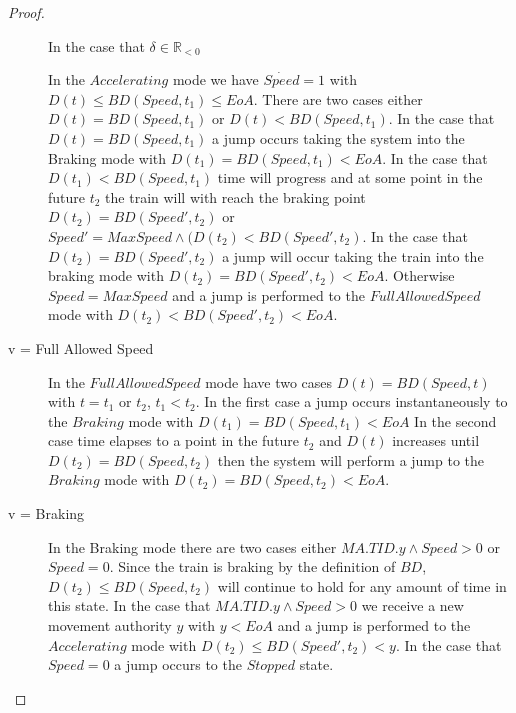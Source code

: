 \begin{mytheorem}
\begin{proof}
\begin{description}
In the case that $\delta \in \mathbb{R}_{< 0}$



 In the $Accelerating$ mode we have $\dot{Speed} = 1$ with $D(t) \leq BD(Speed, t_1) \leq  EoA$. There are two cases either $D(t) = BD(Speed,t_1)$ or $D(t) < BD(Speed, t_1)$.  In the case that $D(t) = BD(Speed,t_1)$  a jump occurs taking the system into the Braking mode
with $D(t_1) = BD(Speed,t_1) < EoA$. In the case that $D(t_1) < BD(Speed,t_1)$ time will progress and at some point in the future $t_2$ the train will with reach the braking point $D(t_2) = BD(Speed',t_2)$ or $Speed' = Max Speed \wedge (D(t_2) < BD(Speed', t_2)$.   In the case that $D(t_2) = BD(Speed', t_2)$ a jump will occur taking the train into the braking mode with $D(t_2) = BD(Speed',t_2) < EoA$. Otherwise $Speed = MaxSpeed$ and a jump is performed to the $Full Allowed Speed$ mode with $D(t_2) < BD(Speed', t_2) < EoA$.

\item[v = Full Allowed Speed] In the $Full Allowed Speed$ mode have  two cases  $D(t) = BD(Speed, t)$ with $t = t_1$ or $t_2$,  $t_1 < t_2$. In the first case a jump occurs instantaneously to the $Braking$ mode with $D(t_1) = BD(Speed, t_1) < EoA$ In the second case time elapses to a point in the future $t_2$ and $D(t)$ increases until $D(t_2) = BD(Speed, t_2)$  then the system will perform a jump to the $Braking$ mode with $D(t_2) = BD(Speed, t_2)  < EoA$. 

\item[v = Braking] In the Braking mode there are two cases either $MA.TID.y \wedge Speed > 0$ or $Speed = 0$. Since the train is braking by the definition of $BD$,  $D(t_2) \leq BD(Speed,t_2)$ will continue to hold for any amount of time in this state.  In the case that $MA.TID.y \wedge Speed > 0$ we receive a new movement authority $y$ with $y < EoA$ and a jump is performed to the $Accelerating$ mode with $D(t_2) \leq BD(Speed', t_2) < y$. In the case that $Speed = 0$ a jump occurs to the $Stopped$ state.
\end{description}


\begin{comment}
Initially we are in the stop state and have $D(t) \leq EOA$. There is only one possible transition from this state. we receive a new movement authority with $D(t) < EOA$ and proceed to the accelerating state.
We have two possible cases from the accelerating state. The first case is that the train reaches the braking point and enters the braking state $D(t) = BD(t,speed)$. In this case the trains speed speed will decrease by -1 per unit of time and the train will enter the stop state $EOA$.
The second case is that the train reaches max speed and goes into the maxspeed state. If the train reaches $D(t) = BD(t,speed)$ whilst in the maxspeed state then the train will go into the braking state and the same argument holds from the previous case.
\end{comment}
\end{proof}

\end{mytheorem}



